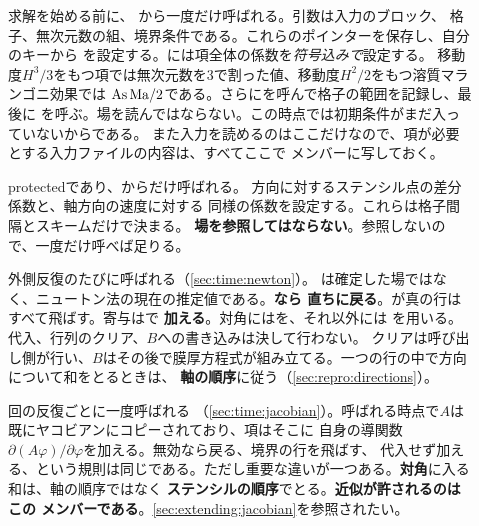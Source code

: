 \begin{description}

  \item[] 求解を始める前に、
    から一度だけ呼ばれる。引数は入力のブロック、
    格子、無次元数の組、境界条件である。これらのポインターを保存し、自分のキーから
    を設定する。には項全体の係数を\emph{符号込みで}設定する。
    移動度$H^{3}/3$をもつ項では無次元数を3で割った値、移動度$H^{2}/2$をもつ溶質マランゴニ効果では
    $\mathrm{As}\,\mathrm{Ma}/2$である。さらにを呼んで格子の範囲を記録し、最後に
    を呼ぶ。場を読んではならない。この時点では初期条件がまだ入っていないからである。
    また入力を読めるのはここだけなので、項が必要とする入力ファイルの内容は、すべてここで
    メンバーに写しておく。

  \item[] protectedであり、からだけ呼ばれる。
    方向に対するステンシル点の差分係数と、軸方向の速度に対する
    同様の係数を設定する。これらは格子間隔とスキームだけで決まる。
    \textbf{場を参照してはならない}。参照しないので、一度だけ呼べば足りる。

  \item[] 外側反復のたびに呼ばれる（\cref{sec:time:newton}）。
    は確定した場ではなく、ニュートン法の現在の推定値である。\textbf{なら
    直ちに戻る}。が真の行はすべて飛ばす。寄与は\code{+=}で
    \textbf{加える}。対角にはを、それ以外には
    を用いる。代入、行列のクリア、$B$への書き込みは決して行わない。
    クリアは呼び出し側が行い、$B$はその後で膜厚方程式が組み立てる。一つの行の中で方向について和をとるときは、
    \textbf{軸の順序}に従う（\cref{sec:repro:directions}）。

  \item[] 回の反復ごとに一度呼ばれる
    （\cref{sec:time:jacobian}）。呼ばれる時点で$A$は既にヤコビアンにコピーされており、項はそこに
    自身の導関数$\partial(A\varphi)/\partial\varphi$を加える。無効なら戻る、境界の行を飛ばす、
    代入せず加える、という規則は同じである。ただし重要な違いが一つある。\textbf{対角}に入る和は、軸の順序ではなく
    \textbf{ステンシルの順序}でとる。\textbf{近似が許されるのはこの
    メンバーである}。\cref{sec:extending:jacobian}を参照されたい。


\end{description}
